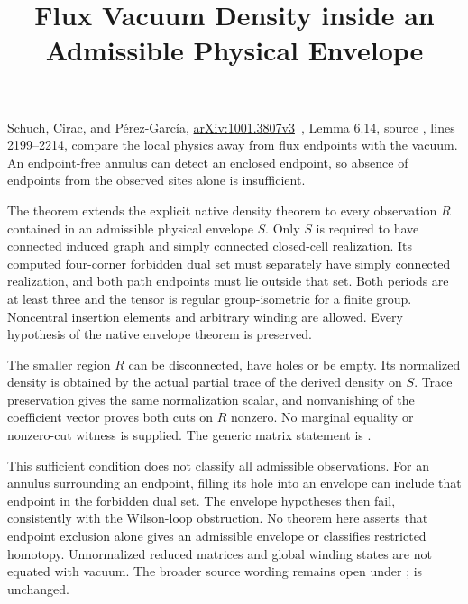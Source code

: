 \documentclass{article}
\title{Flux Vacuum Density inside an Admissible Physical Envelope}
\author{}
\date{}
\begin{document}
\maketitle
{}

Schuch, Cirac, and P\'erez-Garc\'ia,
\href{https://arxiv.org/abs/1001.3807v3}{arXiv:1001.3807v3}~\cite{Schuch2010PEPS},
Lemma 6.14, source
, lines 2199--2214,
compare the local physics away from flux endpoints with the vacuum.
An endpoint-free annulus can detect an enclosed endpoint, so absence of
endpoints from the observed sites alone is insufficient.

The theorem
extends the explicit native density theorem to every observation $R$
contained in an admissible physical envelope $S$. Only $S$ is required
to have connected induced graph and simply connected closed-cell realization.
Its computed four-corner forbidden dual set must separately have simply
connected realization, and both path endpoints must lie outside that set.
Both periods are at least three and the tensor is regular group-isometric
for a finite group. Noncentral insertion elements and arbitrary winding
are allowed. Every hypothesis of the native envelope theorem is preserved.

The smaller region $R$ can be disconnected, have holes or be empty.
Its normalized density is obtained by the actual partial trace of the
derived density on $S$. Trace preservation gives the same normalization
scalar, and nonvanishing of the coefficient vector proves both cuts on $R$
nonzero. No marginal equality or nonzero-cut witness is supplied.
The generic matrix statement is
.

This sufficient condition does not classify all admissible observations.
For an annulus surrounding an endpoint, filling its hole into an envelope
can include that endpoint in the forbidden dual set. The envelope hypotheses
then fail, consistently with the Wilson-loop obstruction. No theorem here
asserts that endpoint exclusion alone gives an admissible envelope or
classifies restricted homotopy. Unnormalized reduced matrices and global
winding states are not equated with vacuum. The broader source wording
remains open under ;  is unchanged.


\end{document}

